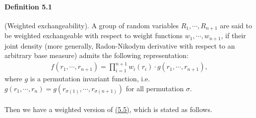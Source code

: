 \documentclass{article}
\numberwithin{equation}{section}
\begin{document}
\paragraph{Definition 5.1} (Weighted exchangeability). A group of random variables $R_1,\cdots,R_{n+1}$ are said to be weighted exchangeable with respect to weight functions $w_1,\cdots,w_{n+1}$, if their joint density (more generally, Radon-Nikodym derivative with respect to an arbitrary base measure) admits the following representation:
\begin{align*}
	f(r_1,\cdots,r_{n+1}) = \prod_{i=1}^{n+1}w_i(r_i)\cdot g(r_1,\cdots,r_{n+1}),\tag{5.6}\label{5.6}
\end{align*}
where $g$ is a permutation invariant function, i.e. $g(r_1,\cdots,r_n)=g(r_{\sigma(1)},\cdots,r_{\sigma(n+1)})$ for all permutation $\sigma.$

\paragraph{} Then we have a weighted version of \hyperref[5.5]{(5.5)}, which is stated as follows.
\end{document}
